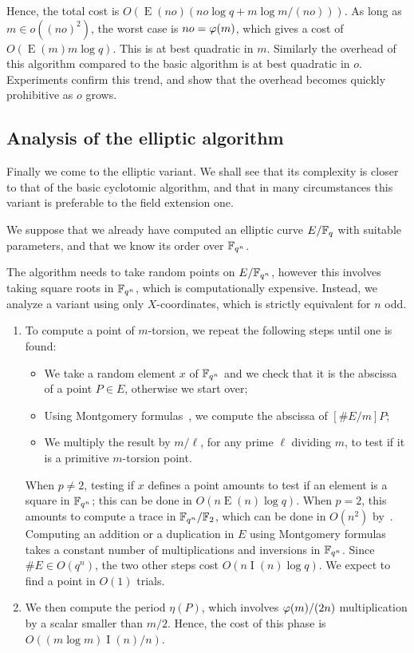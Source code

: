 \documentclass{article}
\DeclareMathOperator{\Ext}{E}
\DeclareMathOperator{\Inv}{I}
\begin{document}
Hence, the total cost is $O(\Ext(no)(no\log q + m\log m/(no)))$. As
long as $m\in o\left((no)^2\right)$, the worst case is $no=\varphi(m)$,
which gives a cost of $O(\Ext(m)m\log q)$. This is at best quadratic
in $m$. Similarly the overhead of this algorithm compared to the basic
algorithm is at best quadratic in $o$. Experiments confirm this trend,
and show that the overhead becomes quickly prohibitive as $o$ grows.


\subsection{Analysis of the elliptic algorithm}

Finally we come to the elliptic variant. We shall see that its
complexity is closer to that of the basic cyclotomic algorithm, and
that in many circumstances this variant is preferable to the field
extension one.

We suppose that we already have computed an elliptic curve $E/\mathbb{F}_q$
with suitable parameters, and that we know its order over $\mathbb{F}_{q^n}$.

The algorithm needs to take random points on $E/\mathbb{F}_{q^n}$, however
this involves taking square roots in $\mathbb{F}_{q^n}$, which is
computationally expensive. Instead, we analyze a variant using only
$X$-coordinates, which is strictly equivalent for $n$ odd.

\begin{enumerate}
\item To compute a point of $m$-torsion, we repeat the following steps
  until one is found:
  \begin{itemize}
  \item We take a random element $x$ of $\mathbb{F}_{q^n}$ and we check that
    it is the abscissa of a point $P\in E$, otherwise we start over;
  \item Using Montgomery formulas~\cite{}, we compute the abscissa of
    $[\#E/m]P$;
  \item We multiply the result by $m/\ell$, for any prime $\ell$
    dividing $m$, to test if it is a primitive $m$-torsion point.
  \end{itemize}
  When $p\ne2$, testing if $x$ defines a point amounts to test if an
  element is a square in $\mathbb{F}_{q^n}$; this can be done in
  $O(n\Ext(n)\log q)$. When $p=2$, this amounts to compute a trace in
  $\mathbb{F}_{q^n}/\mathbb{F}_2$, which can be done in $O(n^2)$ by~\cite{}. Computing
  an addition or a duplication in $E$ using Montgomery formulas takes
  a constant number of multiplications and inversions in $\mathbb{F}_{q^n}$.
  Since $\#E\in O(q^n)$, the two other steps cost $O(n\Inv(n)\log
  q)$. We expect to find a point in $O(1)$ trials.
\item We then compute the period $\eta(P)$, which involves
  $\varphi(m)/(2n)$ multiplication by a scalar smaller than
  $m/2$. Hence, the cost of this phase is $O((m\log m)\Inv(n)/n)$.  
\end{enumerate}
\end{document}

